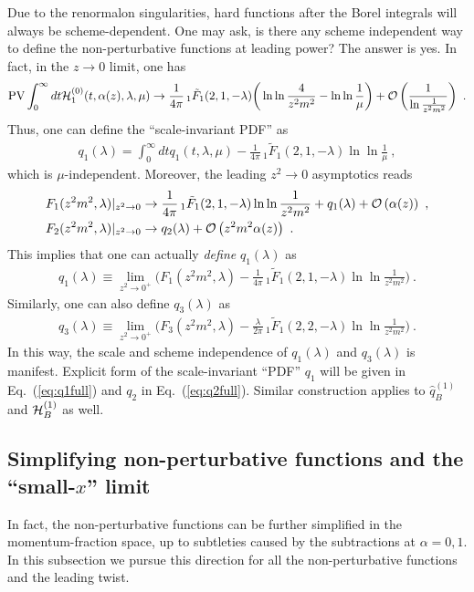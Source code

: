 \documentclass[a4paper,11pt]{article}
\begin{document}
Due to the renormalon singularities, hard functions after the Borel integrals will always be scheme-dependent. One may ask, is there any scheme independent way to define the non-perturbative functions at leading power? The answer is yes. In fact, in the $z\rightarrow 0$ limit, one has
\begin{align}
{\rm PV}\int_{0}^{\infty} dt {\cal H}_1^{(0)}(t,\alpha(z),\lambda,\mu) \rightarrow \frac{1}{4\pi}\,_1\tilde F_1(2,1,-\lambda) \bigg(\ln \ln \frac{4}{z^2m^2}-\ln \ln \frac{1}{\mu}\bigg)+{\cal O}\left(\frac{1}{\ln \frac{1}{z^2m^2}}\right) \ .
\end{align}
Thus, one can define the ``scale-invariant PDF'' as
\begin{align}\label{eq:scaleq1}
q_1(\lambda)=\int_{0}^{\infty} dt q_1(t,\lambda,\mu)-\frac{1}{4\pi}\,_1\tilde F_1(2,1,-\lambda)\ln \ln \frac{1}{\mu} \ ,
\end{align}
which is $\mu$-independent. Moreover, the leading $z^2\rightarrow 0$ asymptotics reads
\begin{align}
&F_1(z^2m^2,\lambda)|_{z^2\rightarrow 0}\rightarrow \frac{1}{4\pi}\,_1\tilde F_1(2,1,-\lambda) \ln \ln \frac{1}{z^2m^2}+q_1(\lambda)+{\cal O}\left(\alpha(z)\right)  \ , \\
&F_2(z^2m^2,\lambda)|_{z^2\rightarrow 0}\rightarrow q_2(\lambda)+{\cal O}\left(z^2m^2\alpha(z)\right) \ . 
\end{align}
This implies that one can actually {\it define} $q_1(\lambda)$ as 
\begin{align}
q_1(\lambda) \equiv \lim_{z^2\rightarrow 0^+} \bigg( F_1(z^2m^2,\lambda)-\frac{1}{4\pi}\,_1\tilde F_1(2,1,-\lambda) \ln \ln \frac{1}{z^2m^2}\bigg) \ .
\end{align}
Similarly, one can also define 
$q_3(\lambda)$ as
\begin{align}
q_3(\lambda) \equiv \lim_{z^2\rightarrow 0^+} \bigg( F_3(z^2m^2,\lambda)-\frac{\lambda}{2\pi}\,_1\tilde F_1(2,2,-\lambda) \ln \ln \frac{1}{z^2m^2}\bigg) \ .
\end{align}
In this way, the scale and scheme independence of  $q_1(\lambda)$ and $q_3(\lambda)$ is manifest. Explicit form of the scale-invariant ``PDF'' $q_1$ will be given in Eq.~(\ref{eq:q1full}) and $q_2$ in Eq.~(\ref{eq:q2full}). Similar construction applies to $\hat q^{(1)}_B$ and ${\cal H}^{(1)}_B$ as well. 


\subsection{Simplifying non-perturbative functions and the ``small-$x$'' limit}\label{sec:PDF}
In fact, the non-perturbative functions can be further simplified in the momentum-fraction space, up to subtleties caused by the subtractions at $\alpha=0, 1$. In this subsection we pursue this direction for all the non-perturbative functions and the leading twist.
\end{document}
